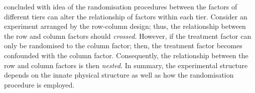 \documentclass[11pt,a4paper]{article}
\begin{document}
\cite{Brien1983} concluded with idea of the randomisation procedures between the factors of different tiers can alter the relationship of factors within each tier. Consider an experiment arranged by the row-column design; thus, the relationship between the row and column factors should \emph{crossed}. However, if the treatment factor can only be randomised to the column factor; then, the treatment factor becomes confounded with the column factor. Consequently, the relationship between the row and column factors is then \emph{nested}. In summary, the experimental structure depends on the innate physical structure as well as how the randomisation procedure is employed. 






 

\end{document}

